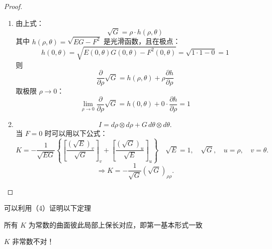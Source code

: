 \documentclass[lang=cn,10pt,thmcnt=section]{elegantbook}
\begin{document}
\begin{proof}
\begin{enumerate}
        \item 由上式：\[
\sqrt{G} = \rho \cdot h(\rho, \theta)
\]
其中 \( h(\rho, \theta) = \sqrt{EG - F^2} \) 是光滑函数，且在极点：
\[
h(0, \theta) = \sqrt{E(0,\theta)G(0,\theta) - F^2(0,\theta)} = \sqrt{1 \cdot 1 - 0} = 1
\]
则
\[
\frac{\partial}{\partial \rho} \sqrt{G} = h(\rho, \theta) + \rho \frac{\partial h}{\partial \rho}
\]
取极限 \(\rho \to 0\)：
\[
\lim_{\rho \to 0} \frac{\partial}{\partial \rho} \sqrt{G} = h(0, \theta) + 0 \cdot \frac{\partial h}{\partial \rho} = 1
\]

        \item \[
        I = d\rho \otimes d\rho + G \, d\theta \otimes d\theta.
        \] 
        当 \( F = 0 \) 时可以用以下公式：
        \[
        K = -\frac{1}{\sqrt{EG}} \left\{ \left[ \frac{(\sqrt{E})_v}{\sqrt{G}} \right]_v + \left[ \frac{(\sqrt{G})_u}{\sqrt{E}} \right]_u \right\} \quad \sqrt{E} = 1, \quad \sqrt{G}, \quad u = \rho, \quad v = \theta.
        \]
        \[
        \Rightarrow K = -\frac{1}{\sqrt{G}} (\sqrt{G})_{\rho\rho}.
        \]
        
    \end{enumerate}
\end{proof}
可以利用（4）证明以下定理
\begin{theorem}
    所有 \( K \) 为常数的曲面彼此局部上保长对应，即第一基本形式一致
\end{theorem}
\begin{remark}
    \( K \) 非常数不对！
\end{remark}
\end{document}

